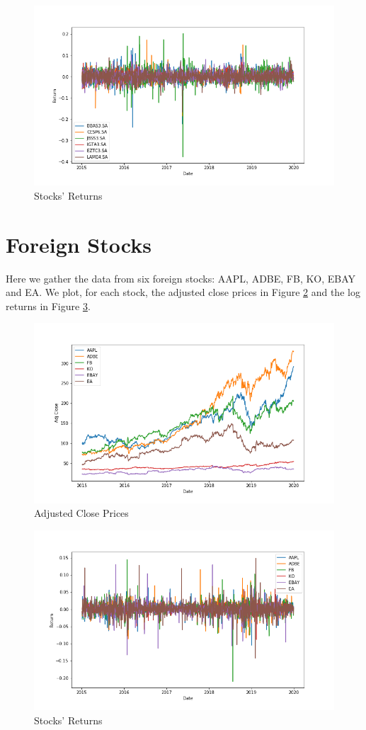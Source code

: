 \documentclass{article}
\begin{document}
\begin{figure}[H]
	\caption{Stocks' Returns}
	\label{fig:br_ret}
	\centering
	\includegraphics[width=\textwidth]{ret.png}
\end{figure}

\section{Foreign Stocks}

Here we gather the data from six foreign stocks: AAPL, ADBE, FB, KO, EBAY and EA. We plot, for each stock, the adjusted close prices in Figure \ref{fig:for_adj} and the log returns in Figure \ref{fig:for_ret}.

\begin{figure}[H]
	\caption{Adjusted Close Prices}
	\label{fig:for_adj}
	\centering
	\includegraphics[width=\textwidth]{for_adj_close.png}
\end{figure}

\begin{figure}[H]
	\caption{Stocks' Returns}
	\label{fig:for_ret}
	\centering
	\includegraphics[width=\textwidth]{for_ret.png}
\end{figure}
\end{document}
